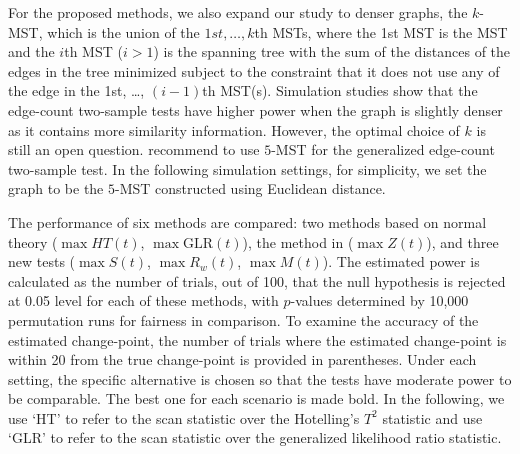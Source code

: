 \documentclass[arxiv, preprint]{imsart}
\numberwithin{equation}{section}
\theoremstyle{plain}
\begin{document}
For the proposed methods, we also expand our study to denser graphs, the $k$-MST, which is the union of the $1st, \hdots, k$th MSTs, where the 1st MST is the MST and the $i$th MST ($i>1$) is the spanning tree with the sum of the distances of the edges in the tree minimized subject to the constraint that it does not use any of the edge in the 1st, \dots, $(i-1)$th MST(s).
Simulation studies show that the edge-count two-sample tests have higher power when the graph is slightly denser as it contains more similarity information. However, the optimal choice of $k$ is still an open question. \cite{chen2017new} recommend to use $5$-MST for the generalized edge-count two-sample test. In the following simulation settings, for simplicity, we set the graph to be the $5$-MST constructed using Euclidean distance. 

The performance of six methods are compared: two methods based on normal theory ($\max HT(t)$, $\max \text{GLR}(t)$), the method in \cite{chen2015graph} ($\max Z(t)$), and three new tests ($\max S(t)$, $\max R_w(t)$, $\max M(t)$). The estimated power is calculated as the number of trials, out of 100, that the null hypothesis is rejected at 0.05 level for each of these methods, with $p$-values determined by 10,000 permutation runs for fairness in comparison.  To examine the accuracy of the estimated change-point, the number of trials where the estimated change-point is within 20 from the true change-point is provided in parentheses.  Under each setting, the specific alternative is chosen so that the tests have moderate power to be comparable.  The best one for each scenario is made bold.  In the following, we use `HT' to refer to the scan statistic over the Hotelling's $T^2$ statistic and use `GLR' to refer to the scan statistic over the generalized likelihood ratio statistic.
\end{document}
